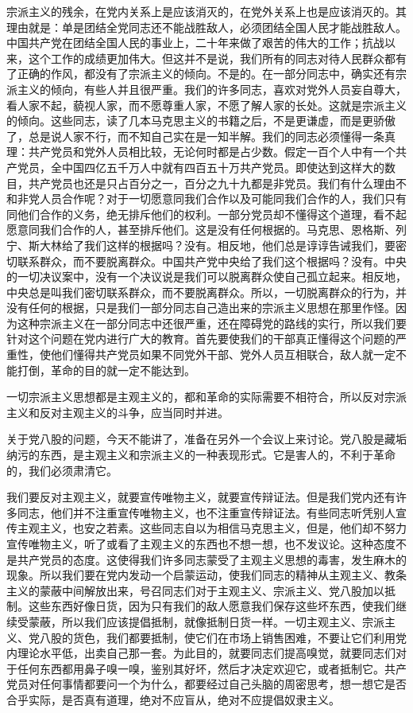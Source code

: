 宗派主义的残余，在党内关系上是应该消灭的，在党外关系上也是应该消灭的。其理由就是：单是团结全党同志还不能战胜敌人，必须团结全国人民才能战胜敌人。中国共产党在团结全国人民的事业上，二十年来做了艰苦的伟大的工作；抗战以来，这个工作的成绩更加伟大。但这并不是说，我们所有的同志对待人民群众都有了正确的作风，都没有了宗派主义的倾向。不是的。在一部分同志中，确实还有宗派主义的倾向，有些人并且很严重。我们的许多同志，喜欢对党外人员妄自尊大，看人家不起，藐视人家，而不愿尊重人家，不愿了解人家的长处。这就是宗派主义的倾向。这些同志，读了几本马克思主义的书籍之后，不是更谦虚，而是更骄傲了，总是说人家不行，而不知自己实在是一知半解。我们的同志必须懂得一条真理：共产党员和党外人员相比较，无论何时都是占少数。假定一百个人中有一个共产党员，全中国四亿五千万人中就有四百五十万共产党员。即使达到这样大的数目，共产党员也还是只占百分之一，百分之九十九都是非党员。我们有什么理由不和非党人员合作呢？对于一切愿意同我们合作以及可能同我们合作的人，我们只有同他们合作的义务，绝无排斥他们的权利。一部分党员却不懂得这个道理，看不起愿意同我们合作的人，甚至排斥他们。这是没有任何根据的。马克思、恩格斯、列宁、斯大林给了我们这样的根据吗？没有。相反地，他们总是谆谆告诫我们，要密切联系群众，而不要脱离群众。中国共产党中央给了我们这个根据吗？没有。中央的一切决议案中，没有一个决议说是我们可以脱离群众使自己孤立起来。相反地，中央总是叫我们密切联系群众，而不要脱离群众。所以，一切脱离群众的行为，并没有任何的根据，只是我们一部分同志自己造出来的宗派主义思想在那里作怪。因为这种宗派主义在一部分同志中还很严重，还在障碍党的路线的实行，所以我们要针对这个问题在党内进行广大的教育。首先要使我们的干部真正懂得这个问题的严重性，使他们懂得共产党员如果不同党外干部、党外人员互相联合，敌人就一定不能打倒，革命的目的就一定不能达到。

一切宗派主义思想都是主观主义的，都和革命的实际需要不相符合，所以反对宗派主义和反对主观主义的斗争，应当同时并进。

关于党八股的问题，今天不能讲了，准备在另外一个会议上来讨论。党八股是藏垢纳污的东西，是主观主义和宗派主义的一种表现形式。它是害人的，不利于革命的，我们必须肃清它。

我们要反对主观主义，就要宣传唯物主义，就要宣传辩证法。但是我们党内还有许多同志，他们并不注重宣传唯物主义，也不注重宣传辩证法。有些同志听凭别人宣传主观主义，也安之若素。这些同志自以为相信马克思主义，但是，他们却不努力宣传唯物主义，听了或看了主观主义的东西也不想一想，也不发议论。这种态度不是共产党员的态度。这使得我们许多同志蒙受了主观主义思想的毒害，发生麻木的现象。所以我们要在党内发动一个启蒙运动，使我们同志的精神从主观主义、教条主义的蒙蔽中间解放出来，号召同志们对于主观主义、宗派主义、党八股加以抵制。这些东西好像日货，因为只有我们的敌人愿意我们保存这些坏东西，使我们继续受蒙蔽，所以我们应该提倡抵制，就像抵制日货一样。一切主观主义、宗派主义、党八股的货色，我们都要抵制，使它们在市场上销售困难，不要让它们利用党内理论水平低，出卖自己那一套。为此目的，就要同志们提高嗅觉，就要同志们对于任何东西都用鼻子嗅一嗅，鉴别其好坏，然后才决定欢迎它，或者抵制它。共产党员对任何事情都要问一个为什么，都要经过自己头脑的周密思考，想一想它是否合乎实际，是否真有道理，绝对不应盲从，绝对不应提倡奴隶主义。

